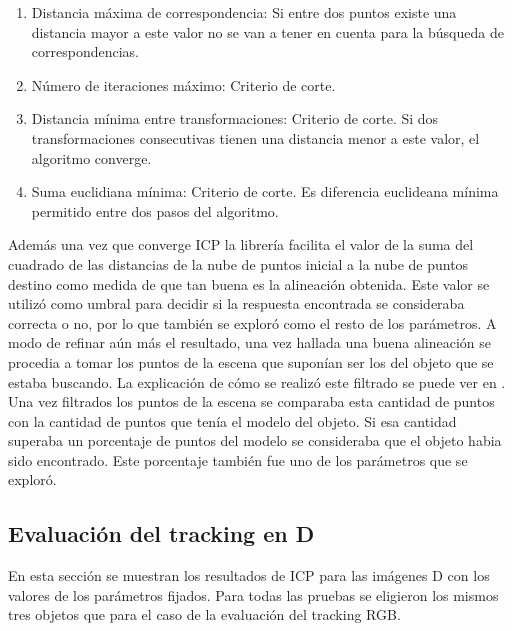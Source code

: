 \begin{enumerate}
	\item Distancia máxima de correspondencia: Si entre dos puntos existe una distancia mayor a este valor no se van a tener en cuenta para la búsqueda de correspondencias.
	\item Número de iteraciones máximo: Criterio de corte. 
	\item Distancia mínima entre transformaciones: Criterio de corte. Si dos transformaciones consecutivas tienen una distancia menor a este valor, el algoritmo converge.
	\item Suma euclidiana mínima: Criterio de corte. Es diferencia euclideana mínima permitido entre dos pasos del algoritmo.
\end{enumerate}

Además una vez que converge ICP la librería facilita el valor de la suma del cuadrado de las distancias de la nube de puntos inicial a la nube de puntos destino como medida de que tan buena es la alineación obtenida. Este valor se utilizó como umbral para decidir si la respuesta encontrada se consideraba correcta o no, por lo que también se exploró como el resto de los parámetros. A modo de refinar aún más el resultado, una vez hallada una buena alineación se procedia a tomar los puntos de la escena que suponían ser los del objeto que se estaba buscando. La explicación de cómo se realizó este filtrado se puede ver en . Una vez filtrados los puntos de la escena se comparaba esta cantidad de puntos con la cantidad de puntos que tenía el modelo del objeto. Si esa cantidad superaba un porcentaje de puntos del modelo se consideraba que el objeto habia sido encontrado. Este porcentaje también fue uno de los parámetros que se exploró.

\subsection{Evaluación del tracking en D}
En esta sección se muestran los resultados de ICP para las imágenes D con los valores de los parámetros fijados. Para todas las pruebas se eligieron los mismos tres objetos que para el caso de la evaluación del tracking RGB.

